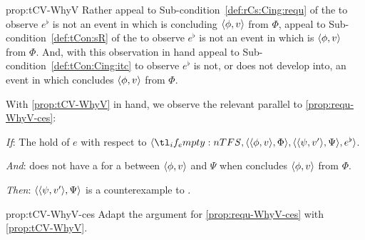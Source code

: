 \begin{note}
\begin{argument}{prop:tCV-WhyV}
    Rather appeal to Sub-condition~\ref{def:rCs:Cing:requ} of the \rCon{} to observe \(e^{\flat}\) is not an event in which \vAgent{} is concluding \(\langle \phi, v \rangle\) from \(\Phi\), appeal to Sub-condition~\ref{def:tCon:sR} of the \tCon{} to observe \(e^{\flat}\) is not an event in which \vAgent{} is \tCV{} \(\langle \phi, v \rangle\) from \(\Phi\).
    And, with this observation in hand appeal to Sub-condition~\ref{def:tCon:Cing:itc} to observe \(e^{\flat}\) is not, or does not develop into, an event in which \vAgent{} concludes \(\langle \phi, v \rangle\) from \(\Phi\).
  \end{argument}

  \noindent%
  With \autoref{prop:tCV-WhyV} in hand, we observe the relevant parallel to \autoref{prop:requ-WhyV-ces}:

  \begin{proposition}
    \label{prop:tCV-WhyV-ces}
    \vspace{-\baselineskip}
    \begin{itenum}
    \item[\emph{If}:]
      The  hold of \(e\) with respect to \(\langle \vAgent{}, \pvp{\phi}{v}{\Phi}, \pvp{\psi}{v'}{\Psi}, e^{\flat} \rangle\).
    \item[\emph{And}:]
      \vAgent{} does not have a \wit{} for a \ros{} between \(\langle \phi, v \rangle\) and \(\Psi\) when \vAgent{} concludes \(\langle \phi, v \rangle\) from \(\Phi\).
    \item[\emph{Then}:]
      \(\langle \langle \psi, v' \rangle, \Psi \rangle\) is a counterexample to \issueConstraint{}.
    \end{itenum}
    \vspace{-\baselineskip}
  \end{proposition}

  \begin{argument}{prop:tCV-WhyV-ces}
    Adapt the argument for \autoref{prop:requ-WhyV-ces} with \autoref{prop:tCV-WhyV}.
  \end{argument}
\end{note}

